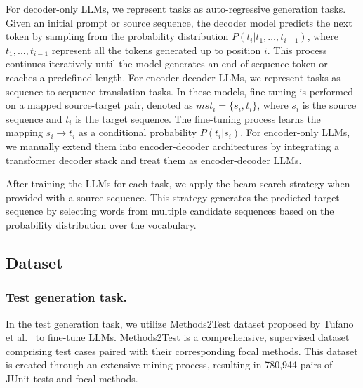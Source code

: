 

For decoder-only LLMs, we represent tasks as auto-regressive generation tasks. 
Given an initial prompt or source sequence, the decoder model predicts the next token by sampling from the probability distribution  $P(t_i|t_1, …, t_{i-1})$, where  $t_1, ..., t_{i-1} $ represent all the tokens generated up to position $i$. This process continues iteratively until the model generates an end-of-sequence token or reaches a predefined length. 
For encoder-decoder LLMs, we represent tasks as sequence-to-sequence translation tasks. 
In these models, fine-tuning is performed on a mapped source-target pair, denoted as $mst_i = \{s_i, t_i\}$, where $s_i$ is the source sequence and $t_i$ is the target sequence. 
The fine-tuning process learns the mapping $s_i \rightarrow t_i$ as a conditional probability $P(t_i | s_i)$.
For encoder-only LLMs, we manually extend them into encoder-decoder architectures by integrating a transformer decoder stack and treat them as encoder-decoder LLMs.

After training the LLMs for each task, we apply the beam search strategy when provided with a source sequence. 
This strategy generates the predicted target sequence by selecting words from multiple candidate sequences based on the probability distribution over the vocabulary. 









    


    

    


    
    
    


    







    


\subsection{Dataset}
\label{sec:dataset}

\subsubsection{Test generation task.}
In the test generation task, we utilize {Methods2Test} dataset proposed by Tufano et al.~\cite{tufano_methods2test_2022, tufano_unit_2021} to fine-tune LLMs. {Methods2Test} is a comprehensive, supervised dataset comprising test cases paired with their corresponding focal methods. This dataset is created through an extensive mining process, resulting in 780,944 pairs of JUnit tests and focal methods.

